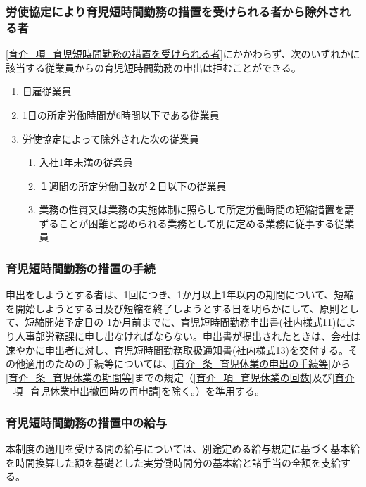 \documentclass{jsarticle}
\begin{document}
\subsubsection{労使協定により育児短時間勤務の措置を受けられる者から除外される者}
\label{育介_項_労使協定により育児短時間勤務の措置を受けられる者から除外される者}
\ref{育介_項_育児短時間勤務の措置を受けられる者}にかかわらず、次のいずれかに該当する従業員からの育児短時間勤務の申出は拒むことができる。
\begin{enumerate}
  \item 日雇従業員
  \item 1日の所定労働時間が6時間以下である従業員
  \item 労使協定によって除外された次の従業員
    \begin{enumerate}
      \item 入社1年未満の従業員
      \item １週間の所定労働日数が２日以下の従業員
      \item 業務の性質又は業務の実施体制に照らして所定労働時間の短縮措置を講ずることが困難と認められる業務として別に定める業務に従事する従業員\label{enum:育介_項_労使協定により育児短時間勤務の措置を受けられる者から除外される者_困難者}
    \end{enumerate}
\end{enumerate}

\subsubsection{育児短時間勤務の措置の手続}
\label{育介_項_育児短時間勤務の措置の手続}
申出をしようとする者は、1回につき、1か月以上1年以内の期間について、短縮を開始しようとする日及び短縮を終了しようとする日を明らかにして、原則として、短縮開始予定日の 1か月前までに、育児短時間勤務申出書(社内様式11)により人事部労務課に申し出なければならない。申出書が提出されたときは、会社は速やかに申出者に対し、育児短時間勤務取扱通知書(社内様式13)を交付する。その他適用のための手続等については、\ref{育介_条_育児休業の申出の手続等}から\ref{育介_条_育児休業の期間等}までの規定（\ref{育介_項_育児休業の回数}及び\ref{育介_項_育児休業申出撤回時の再申請}を除く。）を準用する。

\subsubsection{育児短時間勤務の措置中の給与}
\label{育介_項_育児短時間勤務の措置中の給与}
本制度の適用を受ける間の給与については、別途定める給与規定に基づく基本給を時間換算した額を基礎とした実労働時間分の基本給と諸手当の全額を支給する。
\end{document}
